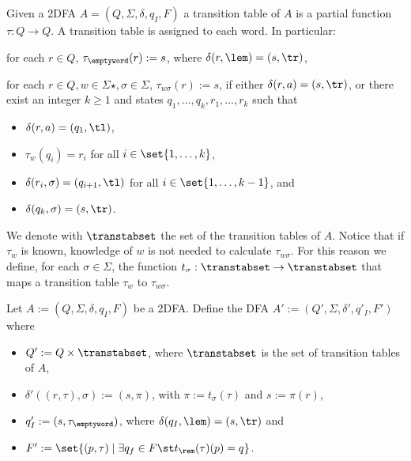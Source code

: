 \begin{defn}
	Given a 2DFA $A=(Q,\Sigma,\delta,q_I,F)$ a transition table of $A$ is a partial function $\tau:Q\to Q$.
	A transition table is assigned to each word. In particular:
	\begin{rules}
		\item for each $r\in Q$, $\tau_\emptyword(r):=s$, where $\delta(r,\lem)=(s,\tr)$,
		\item for each $r\in Q,w\in\Sigma\star,\sigma\in\Sigma$, $\tau_{w\sigma}(r):=s$, if either $\delta(r,a)=(s,\tr)$, or there exist an integer $k\ge1$ and states $q_1,\dots,q_k,r_1,\dots,r_k$ such that
		\begin{itemize}
			\item $\delta(r,a)=(q_1,\tl)$,
			\item $\tau_w(q_i)=r_i$ for all $i\in\set{1,\dots,k}$,
			\item $\delta(r_i,\sigma)=(q_{i+1},\tl)$ for all $i\in\set{1,\dots,k-1}$, and
			\item $\delta(q_k,\sigma)=(s,\tr)$.
		\end{itemize}
	\end{rules}
	We denote with $\transtabset$ the set of the transition tables of $A$.
	Notice that if $\tau_w$ is known, knowledge of $w$ is not needed to calculate $\tau_{w\sigma}$.
	For this reason we define, for each $\sigma\in\Sigma$, the function $t_\sigma:\transtabset\to\transtabset$ that maps a transition table $\tau_w$ to $\tau_{w\sigma}$.
\end{defn}



Let $A:=(Q,\Sigma,\delta,q_I,F)$ be a 2DFA.
Define the DFA $A':=(Q',\Sigma,\delta',q'_I,F')$ where
\begin{itemize}
	\item $Q':=Q\times\transtabset$, where $\transtabset$ is the set of transition tables of $A$,
	\item $\delta'((r,\tau),\sigma):=(s,\pi)$, with $\pi:=t_\sigma(\tau)$ and $s:=\pi(r)$,
	\item $q'_I:=(s,\tau_\emptyword)$, where $\delta(q_I,\lem)=(s,\tr)$ and
	\item $F':=\set{(p,\tau)\mid \exists q_f\in F \st t_\rem(\tau)(p)=q}$.
\end{itemize}

